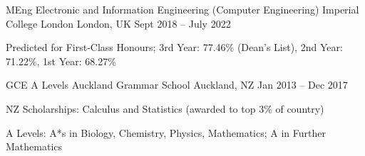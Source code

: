 

\begin{cventries}

  \cventry
    {MEng Electronic and Information Engineering (Computer Engineering)}
    {Imperial College London}
    {London, UK}
    {Sept 2018 -- July 2022}
    {
      \begin{cvitems}
        \item {Predicted for First-Class Honours; 3rd Year: 77.46\% (Dean's List), 2nd Year: 71.22\%, 1st Year: 68.27\%}
      \end{cvitems}
    }

  \cventry
    {GCE A Levels}
    {Auckland Grammar School}
    {Auckland, NZ}
    {Jan 2013 -- Dec 2017}
    {
      \begin{cvitems}
        \item NZ Scholarships: Calculus and Statistics (awarded to top 3\% of country)
        \item A Levels: A*s in Biology, Chemistry, Physics, Mathematics; A in Further Mathematics
      \end{cvitems}
    }


\end{cventries}
